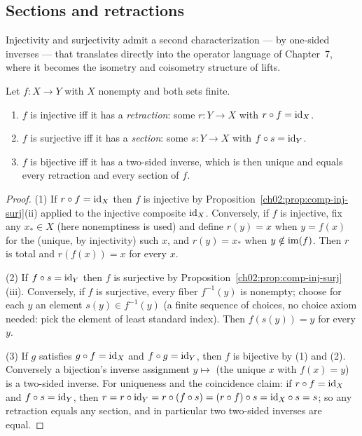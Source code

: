 \subsection{Sections and retractions}

Injectivity and surjectivity admit a second characterization --- by
one-sided inverses --- that translates directly into the operator language
of Chapter~7, where it becomes the isometry and coisometry structure of
lifts.

\begin{proposition}\label{ch02:prop:sections}
Let $f : X \to Y$ with $X$ nonempty and both sets finite.
\begin{enumerate}
\item $f$ is injective iff it has a \emph{retraction}: some
$r : Y \to X$ with $r \circ f = \mathrm{id}_X$.
\item $f$ is surjective iff it has a \emph{section}: some
$s : Y \to X$ with $f \circ s = \mathrm{id}_Y$.
\item $f$ is bijective iff it has a two-sided inverse, which is then
unique and equals every retraction and every section of $f$.
\end{enumerate}
\end{proposition}

\begin{proof}
(1) If $r \circ f = \mathrm{id}_X$ then $f$ is injective by
Proposition~\ref{ch02:prop:comp-inj-surj}(ii) applied to the injective
composite $\mathrm{id}_X$. Conversely, if $f$ is injective, fix any
$x_\ast \in X$ (here nonemptiness is used) and define $r(y) = x$ when
$y = f(x)$ for the (unique, by injectivity) such $x$, and
$r(y) = x_\ast$ when $y \notin \mathrm{im}(f)$. Then $r$ is total and
$r(f(x)) = x$ for every $x$.

(2) If $f \circ s = \mathrm{id}_Y$ then $f$ is surjective by
Proposition~\ref{ch02:prop:comp-inj-surj}(iii). Conversely, if $f$ is
surjective, every fiber $f^{-1}(y)$ is nonempty; choose for each $y$ an
element $s(y) \in f^{-1}(y)$ (a finite sequence of choices, no choice
axiom needed: pick the element of least standard index). Then
$f(s(y)) = y$ for every $y$.

(3) If $g$ satisfies $g \circ f = \mathrm{id}_X$ and $f \circ g = \mathrm{id}_Y$, then
$f$ is bijective by (1) and (2). Conversely a bijection's inverse
assignment $y \mapsto$ (the unique $x$ with $f(x) = y$) is a two-sided
inverse. For uniqueness and the coincidence claim: if
$r \circ f = \mathrm{id}_X$ and $f \circ s = \mathrm{id}_Y$, then
$r = r \circ \mathrm{id}_Y = r \circ (f \circ s) = (r \circ f) \circ s =
\mathrm{id}_X \circ s = s$; so any retraction equals any section, and in
particular two two-sided inverses are equal.
\end{proof}

